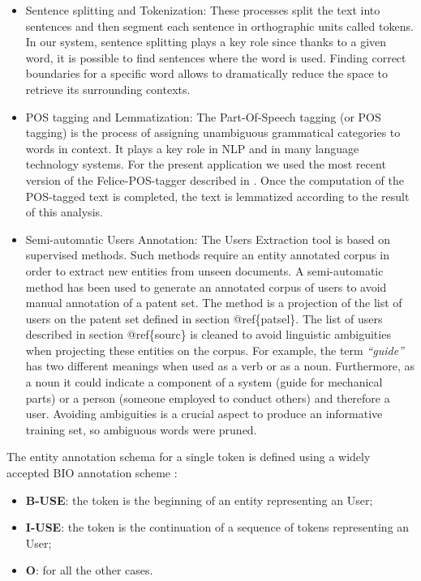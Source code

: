 \documentclass[]{book}
\providecommand{\tightlist}{%
  \setlength{\itemsep}{0pt}\setlength{\parskip}{0pt}}
\begin{document}
\begin{itemize}
\item
  Sentence splitting and Tokenization: These processes split the text
  into sentences and then segment each sentence in orthographic units
  called tokens. In our system, sentence splitting plays a key role
  since thanks to a given word, it is possible to find sentences where
  the word is used. Finding correct boundaries for a specific word
  allows to dramatically reduce the space to retrieve its surrounding
  contexts.
\item
  POS tagging and Lemmatization: The Part-Of-Speech tagging (or POS
  tagging) is the process of assigning unambiguous grammatical
  categories to words in context. It plays a key role in NLP and in many
  language technology systems. For the present application we used the
  most recent version of the Felice-POS-tagger described in
  \citep{dell2009ensemble}. Once the computation of the POS-tagged text
  is completed, the text is lemmatized according to the result of this
  analysis.
\item
  Semi-automatic Users Annotation: The Users Extraction tool is based on
  supervised methods. Such methods require an entity annotated corpus in
  order to extract new entities from unseen documents. A semi-automatic
  method has been used to generate an annotated corpus of users to avoid
  manual annotation of a patent set. The method is a projection of the
  list of users on the patent set defined in section @ref\{patsel\}. The
  list of users described in section @ref\{sourc\} is cleaned to avoid
  linguistic ambiguities when projecting these entities on the corpus.
  For example, the term \emph{``guide''} has two different meanings when
  used as a verb or as a noun. Furthermore, as a noun it could indicate
  a component of a system (guide for mechanical parts) or a person
  (someone employed to conduct others) and therefore a user. Avoiding
  ambiguities is a crucial aspect to produce an informative training
  set, so ambiguous words were pruned.
\end{itemize}

The entity annotation schema for a single token is defined using a
widely accepted BIO annotation scheme \cite{ramshaw}:

\begin{itemize}
\tightlist
\item
  \textbf{B-USE}: the token is the beginning of an entity representing
  an User;
\item
  \textbf{I-USE}: the token is the continuation of a sequence of tokens
  representing an User;
\item
  \textbf{O}: for all the other cases.
\end{itemize}
\end{document}
